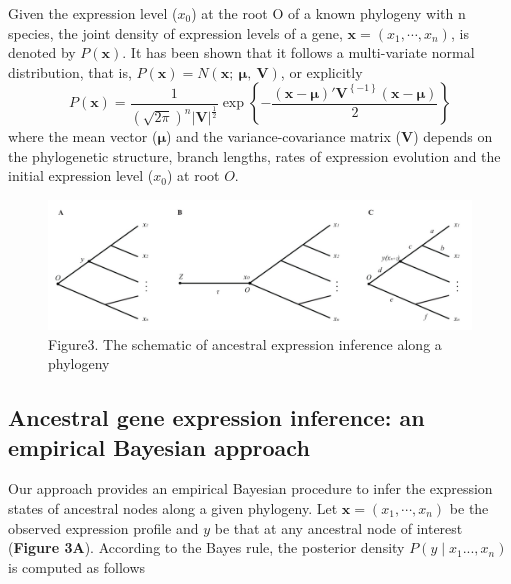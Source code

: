 \documentclass[]{book}
\begin{document}
Given the expression level (\(x_0\)) at the root O of a known phylogeny with n species, the joint density of expression levels of a gene, \(\boldsymbol{x}=(x_1,\cdots,x_n)\), is denoted by \(P\left(\boldsymbol{x}\right)\). It has been shown \citep{hansen1996} that it follows a multi-variate normal distribution, that is, \(P\left(\boldsymbol{x}\right)=N\left(\boldsymbol{x};\  \boldsymbol{\mu},\  \boldsymbol{V}\right)\), or explicitly\\
\[P\left(\boldsymbol{x}\right)=\frac{1}{\left(\sqrt{2\pi}\right)^n\left|\boldsymbol{V}\right|^{\frac{1}{2}}}\exp\left\{-\frac{\left(\boldsymbol{x}-\boldsymbol{\mu}\right)'\boldsymbol{V}^{\left\{-1\right\}}\left(\boldsymbol{x}-\boldsymbol{\mu}\right)}{2}\right\}\tag{4.4}\]
where the mean vector (\(\boldsymbol{\mu}\)) and the variance-covariance matrix (\(\boldsymbol{V}\)) depends on the phylogenetic structure, branch lengths, rates of expression evolution and the initial expression level (\(x_0\)) at root \(O\).

\begin{figure}
\includegraphics[width=0.9\linewidth]{Figure3} \caption{Figure3. The schematic of ancestral expression inference along a phylogeny}\label{fig:unnamed-chunk-34}
\end{figure}

\hypertarget{ancestral-gene-expression-inference-an-empirical-bayesian-approach}{%
\subsection{Ancestral gene expression inference: an empirical Bayesian approach}\label{ancestral-gene-expression-inference-an-empirical-bayesian-approach}}

Our approach provides an empirical Bayesian procedure to infer the expression states of ancestral nodes along a given phylogeny. Let \(\boldsymbol{x}=(x_1,\cdots,x_n)\) be the observed expression profile and \(y\) be that at any ancestral node of interest (\textbf{Figure 3A}). According to the Bayes rule, the posterior density \(P\left(y\mid x_1...,x_n\right)\) is computed as follows
\end{document}
